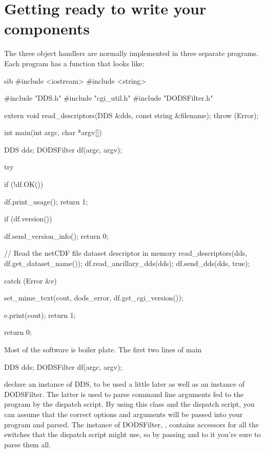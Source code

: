 \documentclass{dods-paper}
\begin{document}
\section{Getting ready to write your components}

The three object handlers are normally implemented in three separate
programs.  Each program has a  function that looks like:

\begin{vcode}{sib} 
#include <iostream>
#include <string>

#include "DDS.h"
#include "cgi_util.h"
#include "DODSFilter.h"

extern void read_descriptors(DDS &dds, const string &filename);
throw  (Error);

int 
main(int argc, char *argv[])
{
    DDS dds;
    DODSFilter df(argc, argv);
       
    try {
        if (!df.OK()) {
             
df.print_usage();
            return 1;
        }
        
        if (df.version()) {
             
df.send_version_info();
            return 0;
        }

// Read the netCDF file dataset descriptor in memory
        read_descriptors(dds,  df.get_dataset_name());
        df.read_ancillary_dds(dds);
        df.send_dds(dds, true);
    }

    catch (Error &e) {

        set_mime_text(cout, dods_error,
        df.get_cgi_version());

        e.print(cout);
        return 1;
    }

    return 0;
}
\end{vcode}


Most of the software is boiler plate. The first two lines of main

\begin{vcode}
DDS dds;
DODSFilter df(argc, argv);
\end{vcode}


declare an instance of DDS, to be used a little later as well as an
instance of DODSFilter. The latter is used to parse command line
arguments fed to the program by the dispatch script. By using this
class and the dispatch script, you can assume that the correct options
and arguments will be passed into your program and parsed. The instance
of DODSFilter, , contains accessors for all the switches that
the dispatch script might use, so by passing  and 
to it you're sure to parse them all.
\end{document}
